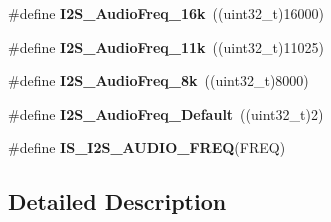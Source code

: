 \begin{DoxyCompactItemize}
\item 
\hypertarget{group___s_p_i___i2_s___audio___frequency_ga5b8f2f8393e022becf0dbb04d1b01950}{\#define {\bfseries I2\-S\-\_\-\-Audio\-Freq\-\_\-16k}~((uint32\-\_\-t)16000)}\label{group___s_p_i___i2_s___audio___frequency_ga5b8f2f8393e022becf0dbb04d1b01950}

\item 
\hypertarget{group___s_p_i___i2_s___audio___frequency_ga3adf95fadd1ad75670ed1babd5faca39}{\#define {\bfseries I2\-S\-\_\-\-Audio\-Freq\-\_\-11k}~((uint32\-\_\-t)11025)}\label{group___s_p_i___i2_s___audio___frequency_ga3adf95fadd1ad75670ed1babd5faca39}

\item 
\hypertarget{group___s_p_i___i2_s___audio___frequency_ga7868ac234485a80d45586dd87cd00043}{\#define {\bfseries I2\-S\-\_\-\-Audio\-Freq\-\_\-8k}~((uint32\-\_\-t)8000)}\label{group___s_p_i___i2_s___audio___frequency_ga7868ac234485a80d45586dd87cd00043}

\item 
\hypertarget{group___s_p_i___i2_s___audio___frequency_ga30f78e8214e8a91cdb6d6360c1d3f18d}{\#define {\bfseries I2\-S\-\_\-\-Audio\-Freq\-\_\-\-Default}~((uint32\-\_\-t)2)}\label{group___s_p_i___i2_s___audio___frequency_ga30f78e8214e8a91cdb6d6360c1d3f18d}

\item 
\#define {\bfseries I\-S\-\_\-\-I2\-S\-\_\-\-A\-U\-D\-I\-O\-\_\-\-F\-R\-E\-Q}(F\-R\-E\-Q)
\end{DoxyCompactItemize}


\subsection{Detailed Description}


